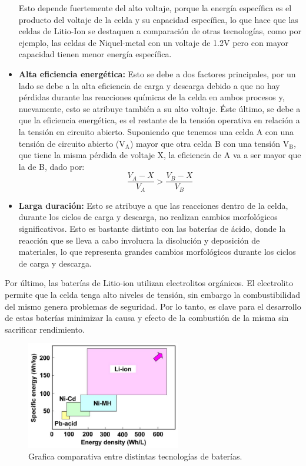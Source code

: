 \documentclass[10pt,a4paper]{article}
\begin{document}
\begin{itemize}
	Esto depende fuertemente del 
	alto voltaje, porque la energía específica es el producto del voltaje 
	de la celda y su capacidad específica, lo que hace que las celdas de 
	Litio-Ion se destaquen a comparación de otras tecnologías, 
	como por ejemplo, las celdas de Niquel-metal con un voltaje de 1.2V 
	pero con mayor capacidad tienen menor energía específica. 
    \item \textbf{Alta eficiencia energética:} Esto se debe a dos 
	factores principales, por un lado se debe a la alta eficiencia de 
	carga y descarga debido a que no hay pérdidas durante las reacciones 
	químicas de la celda en ambos procesos y, nuevamente, esto se atribuye 
	también a su alto voltaje. Éste último, se debe a que la eficiencia 
	energética, es el restante de la tensión operativa en relación a la 
	tensión en circuito abierto. Suponiendo que tenemos una celda A con una 
	tensión de circuito abierto ($\mathrm{V_A}$) mayor que otra celda B con 
	una tensión $\mathrm{V_B}$, que tiene la misma pérdida de voltaje X, 
	la eficiencia de A va a ser mayor que la de B, dado por:
	\vspace{5mm}
	\begin{equation}
	    \frac{V_A - X}{V_A} > \frac{V_B - X}{V_B} \nonumber
	\end{equation}
    \item \textbf{Larga duración:} Esto se atribuye a que las reacciones 
	dentro de la celda, durante los ciclos de carga y descarga, no realizan 
	cambios morfológicos significativos. Esto es bastante distinto con las 
	baterías de ácido, donde la reacción que se lleva a cabo involucra la 
	disolución y deposición de materiales, lo que representa grandes 
	cambios morfológicos durante los ciclos de carga y descarga.
\end{itemize}

\noindent Por último, las baterías de Litio-ion utilizan electrolitos orgánicos.
El electrolito permite que la celda tenga alto niveles de tensión, sin embargo
la combustibilidad del mismo genera problemas de seguridad. Por lo tanto, es
clave para el desarrollo de estas baterías minimizar la causa y efecto de la
combustión de la misma sin sacrificar rendimiento.

\begin{figure}[h!]
    \begin{center}
	\includegraphics[width=0.6\textwidth]{comparisson-liion.png}
	\caption{Grafica comparativa entre distintas
	tecnologías de baterías.}
	\label{comparisson_batt}
    \end{center}
\end{figure}
\FloatBarrier
\end{document}
